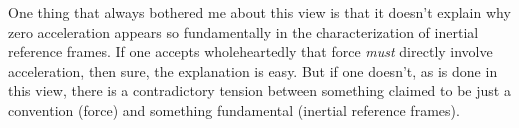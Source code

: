 \documentclass{article}
\begin{document}
%
%
%

One thing that always bothered me about this view is that it doesn't explain why zero acceleration appears so fundamentally in the characterization of inertial reference frames. If one accepts wholeheartedly that force \textit{must} directly involve acceleration, then sure, the explanation is easy. But if one doesn't, as is done in this view, there is a contradictory tension between something claimed to be just a convention (force) and something fundamental (inertial reference frames).
\end{document}
